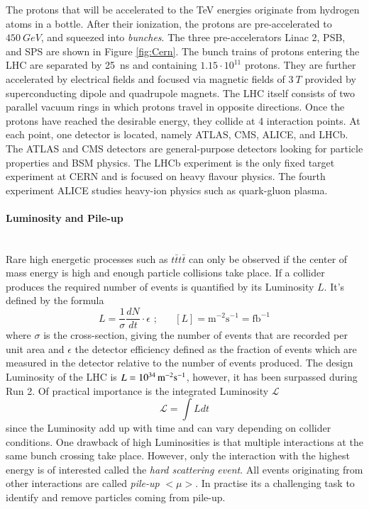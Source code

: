 The protons that will be accelerated to the TeV energies originate from hydrogen atoms in a bottle. After their ionization, the protons are pre-accelerated to $\SI{450}{GeV}$, and squeezed into \textit{bunches}. The three pre-accelerators Linac 2, PSB, and SPS are shown in Figure \ref{fig:Cern}. The bunch trains of protons entering the LHC are separated by \SI{25}{ns} and containing $1.15\cdot 10^{11}$ protons. They are further accelerated by electrical fields and focused via magnetic fields of $\SI{3}{T}$ provided by superconducting dipole and quadrupole magnets. The LHC itself consists of two parallel vacuum rings in which protons travel in opposite directions. Once the protons have reached the desirable energy, they collide at 4 interaction points. At each point, one detector is located, namely ATLAS, CMS, ALICE, and LHCb. The ATLAS and CMS detectors are general-purpose detectors looking for particle properties and BSM physics. The LHCb experiment is the only fixed target experiment at CERN and is focused on heavy flavour physics. The fourth experiment ALICE studies heavy-ion physics such as quark-gluon plasma. \\

\paragraph{Luminosity and Pile-up} \mbox{} \\

Rare high energetic processes such as $t\bar{t}t\bar{t}$ can only be observed if the center of mass energy is high and enough particle collisions take place. If a collider produces the required number of events is quantified by its Luminosity $L$. It's defined by the formula
\begin{equation}
\label{eq:Lumi}
L = \frac{1}{\sigma} \frac{dN}{dt} \cdot \epsilon \,  \,; \, \,\,\,\,\,\,\,\,\, [L] = \text{m}^{-2}\text{s}^{-1}=\text{fb}^{-1}
\end{equation}
where $\sigma$ is the cross-section, giving the number of events that are recorded per unit area and $\epsilon$ the detector efficiency defined as the fraction of events which are measured in the detector relative to the number of events produced. The design Luminosity of the LHC is $L = \SI[parse-numbers=false]{10^{34}}{m}^{-2}\text{s}^{-1}$, however, it has been surpassed during Run 2. Of practical importance is the integrated Luminosity $\mathcal{L}$
\begin{equation}
\mathcal{L} = \int L dt
\end{equation}
since the Luminosity add up with time and can vary depending on collider conditions. One drawback of high Luminosities is that multiple interactions at the same bunch crossing take place. However, only the interaction with the highest energy is of interested called the \textit{hard scattering event}. All events originating from other interactions are called \textit{pile-up} $<\mu>$. In practise its a challenging task to identify and remove particles coming from pile-up.

